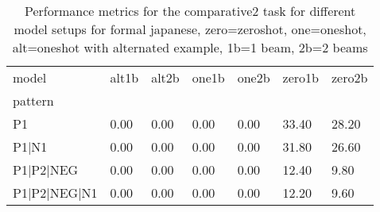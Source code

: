 \begin{table}[h]
\begin{tabular}{l|llllll}
\toprule
model & alt1b & alt2b & one1b & one2b & zero1b & zero2b \\
pattern &  &  &  &  &  &  \\
\midrule
P1 & 0.00 & 0.00 & 0.00 & 0.00 & 33.40 & 28.20 \\
P1|N1 & 0.00 & 0.00 & 0.00 & 0.00 & 31.80 & 26.60 \\
P1|P2|NEG & 0.00 & 0.00 & 0.00 & 0.00 & 12.40 & 9.80 \\
P1|P2|NEG|N1 & 0.00 & 0.00 & 0.00 & 0.00 & 12.20 & 9.60 \\
\bottomrule
\end{tabular}
\caption{Performance metrics for the comparative2 task for different model setups for formal japanese, zero=zeroshot, one=oneshot, alt=oneshot with alternated example, 1b=1 beam, 2b=2 beams}
\label{tab:ja form_comparative2_performance}
\end{table}
